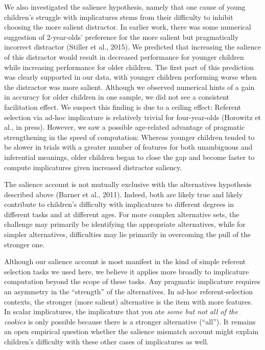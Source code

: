\documentclass[man]{apa6}
\theoremstyle{definition}
\theoremstyle{definition}
\theoremstyle{definition}
\theoremstyle{remark}
\begin{document}
We also investigated the salience hypothesis, namely that one cause of
young children's struggle with implicatures stems from their difficulty
to inhibit choosing the more salient distractor. In earlier work, there
was some numerical suggestion of 2-year-olds' preference for the more
salient but pragmatically incorrect distractor (Stiller et al., 2015).
We predicted that increasing the salience of this distractor would
result in decreased performance for younger children while increasing
performance for older children. The first part of this prediction was
clearly supported in our data, with younger children performing worse
when the distractor was more salient. Although we observed numerical
hints of a gain in accuracy for older children in one sample, we did not
see a consistent facilitation effect. We suspect this finding is due to
a ceiling effect: Referent selection via ad-hoc implicature is
relatively trivial for four-year-olds (Horowitz et al., in press).
However, we saw a possible age-related advantage of pragmatic
strengthening in the speed of computation: Whereas younger children
tended to be slower in trials with a greater number of features for both
unambiguous and inferential meanings, older children began to close the
gap and become faster to compute implicatures given increased distractor
saliency.

The salience account is not mutually exclusive with the alternatives
hypothesis described above (Barner et al., 2011). Indeed, both are
likely true and likely contribute to children's difficulty with
implicatures to different degrees in different tasks and at different
ages. For more complex alternative sets, the challenge may primarily be
identifying the appropriate alternatives, while for simpler
alternatives, difficulties may lie primarily in overcoming the pull of
the stronger one.

Although our salience account is most manifest in the kind of simple
referent selection tasks we used here, we believe it applies more
broadly to implicature computation beyond the scope of these tasks. Any
pragmatic implicature requires an asymmetry in the \enquote{strength} of
the alternatives. In ad-hoc referent-selection contexts, the stronger
(more salient) alternative is the item with more features. In scalar
implicatures, the implicature that you ate \emph{some but not all of the
cookies} is only possible because there is a stronger alternative
(\enquote{all}). It remains an open empirical question whether the
salience mismatch account might explain children's difficulty with these
other cases of implicatures as well.
\end{document}
